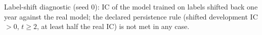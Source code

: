 \begin{table}[t]
\centering\footnotesize
\setlength{\tabcolsep}{4pt}
\caption{Label-shift diagnostic (seed 0): IC of the model trained on labels shifted back one year against the real model; the declared persistence rule (shifted development IC $>0$, $t\ge2$, at least half the real IC) is not met in any case.}
\label{tab:label_shift}
\end{table}
